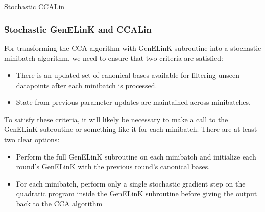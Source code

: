 \documentclass{article}
\begin{document}
	\begin{algorithm}
	\caption{Stochastic CCALin} \label{alg:stochccalin}
	\begin{algorithmic}[1]
	\STATE
	\end{algorithmic}
	\end{algorithm}
	
	\subsubsection{Stochastic GenELinK and CCALin}
	For transforming the CCA algorithm with GenELinK subroutine into a stochastic minibatch algorithm, we need to ensure that two criteria are satisfied:
	
	\begin{itemize}
		\item There is an updated set of canonical bases available for filtering unseen datapoints after each minibatch is processed.
		\item State from previous parameter updates are maintained across minibatches.
	\end{itemize}
	
	\noindent To satisfy these criteria, it will likely be necessary to make a call to the GenELinK subroutine or something like it for each minibatch. There are at least two clear options:
	
	\begin{itemize}
		\item Perform the full GenELinK subroutine on each minibatch and initialize each round's GenELinK with the previous round's canonical bases.
		\item For each minibatch, perform only a single stochastic gradient step on the quadratic program inside the GenELinK subroutine before giving the output back to the CCA algorithm
	\end{itemize}
	
	
	
\end{document}
